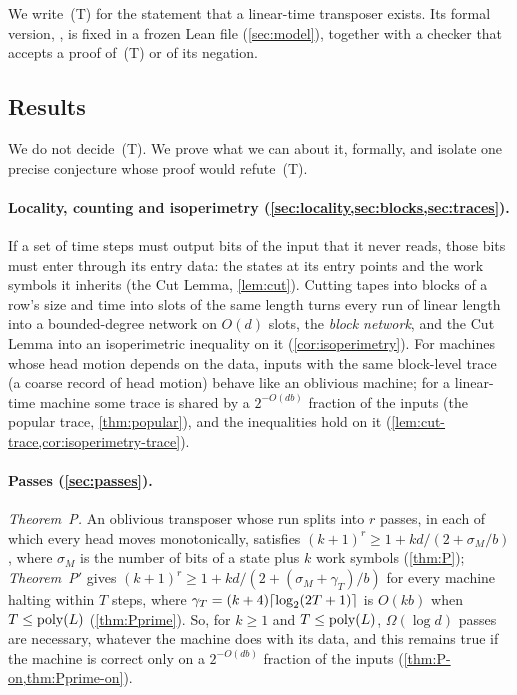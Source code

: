 We write~(T) for the statement that a linear-time transposer exists. Its formal version,
, is fixed in a frozen Lean file (\cref{sec:model}), together with a checker
that accepts a proof of~(T) or of its negation.

\subsection{Results}

We do not decide~(T). We prove what we can about it, formally, and isolate one precise conjecture
whose proof would refute~(T).

\paragraph{Locality, counting and isoperimetry (\cref{sec:locality,sec:blocks,sec:traces}).} If a set of time steps
must output bits of the input that it never reads, those bits must enter through its entry data: the states at its
entry points and the work symbols it inherits (the Cut Lemma, \cref{lem:cut}). Cutting tapes into blocks of a row's
size and time into slots of the same length turns every run of linear length into a bounded-degree network on $O(d)$ slots, the
\emph{block network}, and the Cut Lemma into an isoperimetric inequality on it (\cref{cor:isoperimetry}). For machines
whose head motion depends on the data, inputs with the same block-level trace (a coarse record of head motion) behave like
an oblivious machine; for a linear-time machine some trace is shared by a $2^{-O(db)}$ fraction of the inputs (the popular trace, \cref{thm:popular}), and the
inequalities hold on it (\cref{lem:cut-trace,cor:isoperimetry-trace}).

\paragraph{Passes (\cref{sec:passes}).} \emph{Theorem~P.} An oblivious transposer whose run splits into $r$ passes, in
each of which every head moves monotonically, satisfies $(k+1)^r\ge1+kd/(2+\sigma_M/b)$, where $\sigma_M$ is the number
of bits of a state plus $k$ work symbols (\cref{thm:P}); \emph{Theorem~P$'$} gives $(k+1)^r\ge1+kd/(2+(\sigma_M+\gamma_T)/b)$ for every
machine halting within $T$ steps, where $\gamma_T=(k+4)\lceil \log_2 (2T+1) \rceil$ is $O(kb)$ when $T\le\operatorname{poly}(L)$
(\cref{thm:Pprime}). So, for $k\ge1$ and $T\le\operatorname{poly}(L)$, $\Omega(\log d)$ passes are necessary, whatever the
machine does with its data, and this remains true if the machine is correct only on a $2^{-O(db)}$ fraction of the inputs
(\cref{thm:P-on,thm:Pprime-on}).

